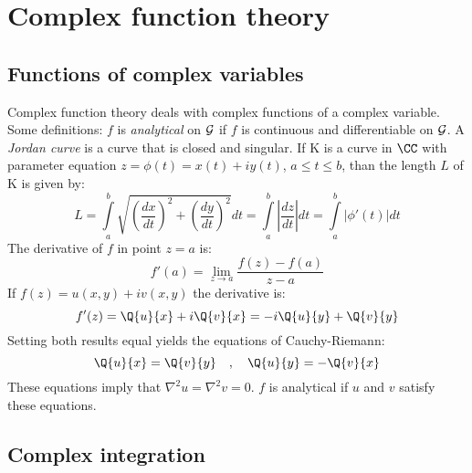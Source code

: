 \chapter{Complex function theory}
\section{Functions of complex variables}
Complex function theory deals with complex functions of a complex variable.
Some definitions:
\npar
$f$ is {\it analytical} on $\cal G$ if $f$ is continuous and differentiable
on $\cal G$.
\npar
A {\it Jordan curve} is a curve that is closed and singular.
\npar
If K is a curve in $\CC$ with parameter equation $z=\phi(t)=x(t)+iy(t)$,
$a\leq t\leq b$, than the length $L$ of K is given by:
\[
L=\int\limits_a^b \sqrt{\left(\frac{dx}{dt}\right)^2+\left(\frac{dy}{dt}\right)^2}dt=
\int\limits_a^b\left|\frac{dz}{dt}\right|dt=\int\limits_a^b|\phi'(t)|dt
\]
The derivative of $f$ in point $z=a$ is:
\[
f'(a)=\lim_{z\rightarrow a}\frac{f(z)-f(a)}{z-a}
\]
If $f(z)=u(x,y)+iv(x,y)$ the derivative is:
\[
f'(z)=\Q{u}{x}+i\Q{v}{x}=-i\Q{u}{y}+\Q{v}{y}
\]
Setting both results equal yields the equations of Cauchy-Riemann:
\[
\Q{u}{x}=\Q{v}{y}~~~,~~~\Q{u}{y}=-\Q{v}{x}
\]
These equations imply that $\nabla^2u=\nabla^2v=0$.
$f$ is analytical if $u$ and $v$ satisfy these equations.

\section{Complex integration}
